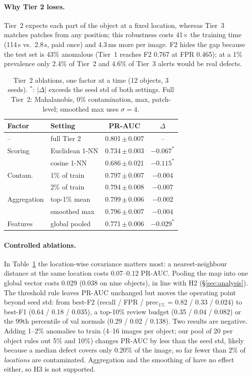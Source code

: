 \paragraph{Why Tier 2 loses.}
Tier~2 expects each part of the object at a fixed location, whereas Tier~3 matches patches from any
position; this robustness costs 41$\times$ the training time (114\,s vs.\ 2.8\,s, paid once) and
4.3\,ms more per image.
F2 hides the gap because the test set is 43\% anomalous (Tier~1 reaches F2 0.767 at FPR 0.465); at a
1\% prevalence only 2.4\% of Tier~2 and 4.6\% of Tier~3 alerts would be real defects.

\begin{table}[t]
  \centering
  \small
  \setlength{\tabcolsep}{3pt}
  \begin{tabular}{@{}llcc@{}}
    \toprule
    Factor & Setting & PR-AUC & $\Delta$ \\
    \midrule
    -- & full Tier 2 & 0.801\,$\pm$\,0.007 & -- \\
    \midrule
    Scoring & Euclidean 1-NN & 0.734\,$\pm$\,0.003 & $-0.067^\ast$ \\
            & cosine 1-NN    & 0.686\,$\pm$\,0.021 & $-0.115^\ast$ \\
    Contam. & 1\% of train & 0.797\,$\pm$\,0.007 & $-0.004$ \\
                  & 2\% of train & 0.794\,$\pm$\,0.008 & $-0.007$ \\
    Aggregation & top-1\% mean          & 0.799\,$\pm$\,0.006 & $-0.002$ \\
                & smoothed max &0.796\,$\pm$\,0.007 & $-0.004$ \\
    Features & global pooled & 0.771\,$\pm$\,0.006 & $-0.029^\ast$ \\
    \bottomrule
  \end{tabular}
  \caption{Tier~2 ablations, one factor at a time (12 objects, 3 seeds). $^\ast$: $|\Delta|$ exceeds
    the seed std of both settings. Full Tier~2: Mahalanobis, 0\% contamination, max, patch-level; smoothed max uses
    $\sigma = 4$.}
  \label{tab:ablation}
\end{table}

\paragraph{Controlled ablations.}
In Table~\ref{tab:ablation} the location-wise covariance matters most: a nearest-neighbour distance at
the same location costs 0.07--0.12 PR-AUC.
Pooling the map into one global vector costs 0.029 (0.038 on nine objects), in line with H2 (\S\ref{sec:analysis}).
The threshold rule leaves PR-AUC unchanged but moves the operating point beyond seed std: from best-F2
(recall / FPR / prec$_{1\%}$ = 0.82 / 0.33 / 0.024) to best-F1 (0.64 / 0.18 / 0.035), a top-10\% review
budget (0.35 / 0.04 / 0.082) or the 99th percentile of val normals (0.29 / 0.02 / 0.138).
Two results are negative.
Adding 1--2\% anomalies to train (4--16 images per object; our pool of 20 per object rules out 5\% and
10\%) changes PR-AUC by less than the seed std, likely because a median defect covers only 0.20\% of
the image, so far fewer than 2\% of \emph{locations} are contaminated.
Aggregation and the smoothing of \citet{defard2021padim} have no effect either, so H3 is not supported.
